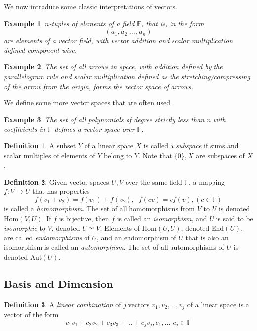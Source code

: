 \documentclass{article}
\newtheorem{example}{Example}[section]
\theoremstyle{remark}
\theoremstyle{definition}
\newtheorem{definition}{Definition}[section]
\begin{document}
We now introduce some classic interpretations of vectors. 

\begin{example}
$n$-tuples of elements of a field $\mathbb{F}$, that is, in the form
\[(a_1, a_2, ..., a_n)\]
are elements of a vector field, with vector addition and scalar multiplication defined component-wise. 
\end{example}

\begin{example}
The set of all arrows in space, with addition defined by the parallelogram rule and scalar multiplication defined as the stretching/compressing of the arrow from the origin, forms the vector space of arrows. 
\end{example}

We define some more vector spaces that are often used. 

\begin{example}
The set of all polynomials of degree strictly less than $n$ with coefficients in $\mathbb{F}$ defines a vector space over $\mathbb{F}$. 
\end{example}

\begin{definition}
A subset $Y$ of a linear space $X$ is called a \textit{subspace} if sums and scalar multiples of elements of $Y$ belong to $Y$. Note that $\{ 0 \}, X$ are subspaces of $X$. 
\end{definition}

\begin{definition}
Given vector spaces $U, V$ over the same field $\mathbb{F}$, a mapping $f: V \longrightarrow U$ that has properties 
\[ f(v_1 + v_2) = f(v_1) + f(v_2), \; \; f(c v) = c f(v), (c \in \mathbb{F})\]
is called a \textit{homomorphism}. The set of all homomorphisms from $V$ to $U$ is denoted Hom$(V, U)$. If $f$ is bijective, then $f$ is called an \textit{isomorphism}, and $U$ is said to be \textit{isomorphic} to $V$, denoted $U \simeq V$. Elements of Hom$(U,U)$, denoted End$(U)$, are called \textit{endomorphisms} of $U$, and an endomorphism of $U$ that is also an isomorphism is called an \textit{automorphism}. The set of all automorphisms of $U$ is denoted Aut$(U)$. 
\end{definition}

\subsection{Basis and Dimension}
\begin{definition}
A \textit{linear combination} of $j$ vectors $v_1, v_2, ..., v_j$ of a linear space is a vector of the form 
\begin{equation}
    c_1 v_1 + c_2 v_2 + c_3 v_3 + ... + c_j v_j, c_1, ..., c_j \in \mathbb{F}
\end{equation}
\end{definition}
\end{document}
